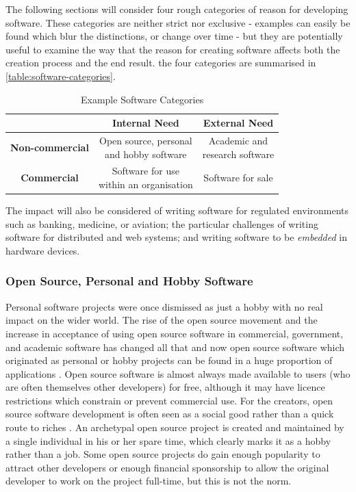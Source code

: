 The following sections will consider four rough categories of reason for developing software. These categories are neither strict nor exclusive - examples can easily be found which blur the distinctions, or change over time - but they are potentially useful to examine the way that the reason for creating software affects both the creation process and the end result. the four categories are summarised in \autoref{table:software-categories}.

\begin{table}
\centering
\begin{tabular}{ c | c | c }
  & \textbf{Internal Need} & \textbf{External Need} \\
  \hline
  \textbf{Non-commercial} & \makecell{Open source, personal \\ and hobby software} & \makecell{Academic and \\ research software} \\ 
  \hline
  \textbf{Commercial} & \makecell{Software for use \\ within an organisation} & Software for sale \\
  \hline
\end{tabular}
\caption{Example Software Categories\label{table:software-categories}}
\end{table}

The impact will also be considered of writing software for regulated environments such as banking, medicine, or aviation; the particular challenges of writing software for distributed and web systems; and writing software to be \emph{embedded} in hardware devices.

\subsubsection{Open Source, Personal and Hobby Software}

Personal software projects were once dismissed as just a hobby with no real impact on the wider world. The rise of the open source movement and the increase in acceptance of using open source software in commercial, government, and academic software has changed all that \citep{Midha2011} and now open source software which originated as personal or hobby projects can be found in a huge proportion of applications \citep{Androutsellis-Theotokis2011}. Open source software is almost always made available to users (who are often themselves other developers) for free, although it may have licence restrictions which constrain or prevent commercial use. For the creators, open source software development is often seen as a social good rather than a quick route to riches \citep{Androutsellis-Theotokis2011} \citep{Raymond2010}. An archetypal open source project is created and maintained by a single individual in his or her spare time, which clearly marks it as a hobby rather than a job. Some open source projects do gain enough popularity to attract other developers or enough financial sponsorship to allow the original developer to work on the project full-time, but this is not the norm.


